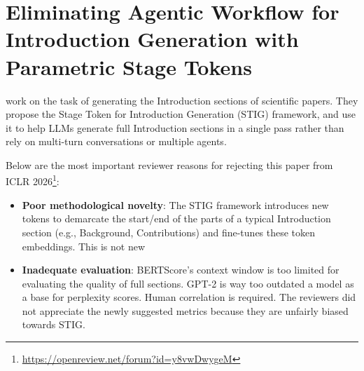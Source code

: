 \section{Eliminating Agentic Workflow for Introduction Generation with Parametric Stage Tokens}

\textcite{zhang2025EliminatingAgenticWorkflow} work on the task of generating the Introduction sections of scientific papers. They propose the Stage Token for Introduction Generation (STIG) framework, and use it to help LLMs generate full Introduction sections in a single pass rather than rely on multi-turn conversations or multiple agents. 

Below are the most important reviewer reasons for rejecting this paper from ICLR 2026\footnote{\url{https://openreview.net/forum?id=y8vwDwygeM}}:
\begin{itemize}
    \item \textbf{Poor methodological novelty}: The STIG framework introduces new tokens to demarcate the start/end of the parts of a typical Introduction section (e.g., Background, Contributions) and fine-tunes these token embeddings. This is not new
    \item \textbf{Inadequate evaluation}: BERTScore's context window is too limited for evaluating the quality of full sections. GPT-2 is way too outdated a model as a base for perplexity scores. Human correlation is required. The reviewers did not appreciate the newly suggested metrics because they are unfairly biased towards STIG. 
\end{itemize}